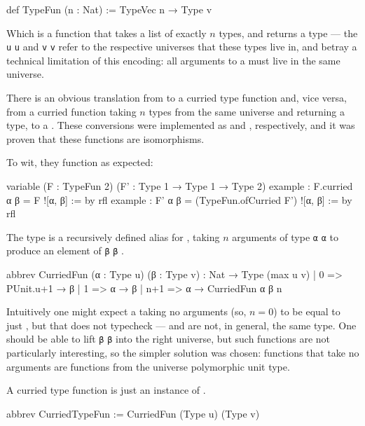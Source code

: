 \documentclass[titlepage]{report}
\newcommand\lean[1]{%
\ifx\leanmode\undefined%
\def\leanmode{1}%
\texttt{\small #1}%
\undef\leanmode%
\else%
\texttt{#1}%
\fi%
}
\begin{document}
\begin{leancode}
    def TypeFun (n : Nat)
      := TypeVec n → Type v
\end{leancode}

Which is a function that takes a list of exactly $n$ types, and returns a type --- the \lean{u} and
\lean{v} refer to the respective universes that these types live in, and betray a technical limitation
of this encoding: all arguments to a  must live in the same universe.

There is an obvious translation from  to a curried type function and, vice versa, from a curried function taking $n$ types from the same universe and returning a type, to a .
These conversions were implemented as  and , respectively, and it was proven that these functions are isomorphisms. 

To wit, they function as expected:
\begin{leancode}
    variable (F : TypeFun 2) (F' : Type 1 → Type 1 → Type 2)
    example : F.curried α β = F ![α, β]                 := by rfl
    example : F' α β = (TypeFun.ofCurried F') ![α, β]   := by rfl
\end{leancode}

The type  is a recursively defined alias for , taking $n$ arguments of type \lean{α} to produce an element of \lean{β}.
\begin{leancode}
    abbrev CurriedFun (α : Type u) (β : Type v) : Nat → Type (max u v)
      | 0   => PUnit.{u+1} → β
      | 1   => α → β
      | n+1 => α → CurriedFun α β n
\end{leancode}
Intuitively one might expect a  taking no arguments (so, $n = 0$) to be equal to  just , but that does not typecheck ---  and  are not, in general, the same type.
One should be able to lift \lean{β} into the right universe, but such functions are not particularly interesting, so the simpler solution was chosen: functions that take no arguments are functions from the universe polymorphic unit type.

A curried type function is just an instance of .
\begin{leancode}
    abbrev CurriedTypeFun := CurriedFun (Type u) (Type v)
\end{leancode}
\end{document}
